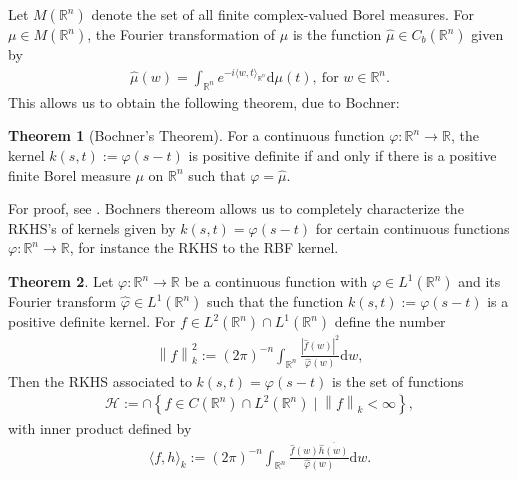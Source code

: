 \documentclass[10pt,twoside,openany,final]{memoir}
\theoremstyle{definition}
\newtheorem{theorem}{Theorem}[chapter]
\theoremstyle{Break}
\newcommand{\lv}{\left\lVert}
\newcommand{\rv}{\right\rVert}
\newcommand{\R}{\mathbb{R}}
\renewcommand{\H}{\mathcal{H}}
\renewcommand{\d}{\mathrm{d}}
\begin{document}
Let $M(\R^n)$ denote the set of all finite complex-valued Borel measures. For $\mu \in M(\R^n)$, the Fourier transformation of $\mu$ is the function $\widehat{\mu} \in C_b(\R^n)$ given by
\begin{align*}
	\widehat{\mu}(w)=\int_{\R^n} e^{-i\langle w, t\rangle_{\R^n}} \d \mu(t), \ \text{for } w \in \R^n.
\end{align*}
This allows us to obtain the following theorem, due to Bochner:
\begin{theorem}[Bochner's Theorem]
	For a continuous function $\varphi \colon \R^n \to \R$, the kernel $k(s,t) := \varphi(s-t)$ is positive definite if and only if there is a positive finite Borel measure $\mu$ on $\R^n$ such that $\varphi = \widehat{\mu}$.
	\label{bochner}
\end{theorem}
For proof, see \cite{ACIAHA}. Bochners thereom allows us to completely characterize the RKHS's of kernels given by $k(s,t)=\varphi(s-t)$ for certain continuous functions $\varphi \colon \R^n \to \R$, for instance the RKHS to the RBF kernel.
\begin{theorem}
	Let $\varphi \colon \R^n \to \R$ be a continuous function with $\varphi \in L^1(\R^n)$ and its Fourier transform $\widehat{\varphi} \in L^1(\R^n)$ such that the function $k(s,t):= \varphi(s-t)$ is a positive definite kernel. For $f \in L^2(\R^n)\cap L^1(\R^n)$ define the number
\begin{align*}
	\lv f \rv_k^2:= (2\pi)^{-n} \int_{\R^n}\frac{|\hat{f}(w)|^2}{\hat{\varphi}(w)} \d w,
\end{align*}
	Then the RKHS associated to $k(s,t) = \varphi(s-t)$ is the set of functions
	\begin{align*}
		\H := \cap \left\{ f \in C(\R^n) \cap L^2(\R^n) \mid \lv f \rv_k < \infty \right\},
	\end{align*}
	with inner product defined by
	\begin{align*}
		\langle f , h \rangle_k := (2 \pi)^{-n} \int_{\R^n} \frac{\hat{f}(w) \overline{\hat{h}(w)}}{\hat{\varphi}(w)} \d w.
	\end{align*}
\end{theorem}
\end{document}
